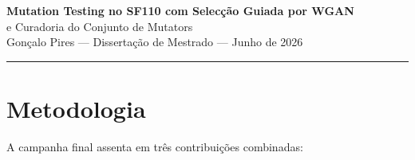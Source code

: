 \documentclass[12pt,a4paper]{article}
\begin{document}

\begin{center}
  {\LARGE\bfseries Mutation Testing no SF110 com Selecção Guiada por WGAN}\\[0.4em]
  {\large e Curadoria do Conjunto de Mutators}\\[0.8em]
  {\large Gonçalo Pires --- Dissertação de Mestrado --- Junho de 2026}
\end{center}

\bigskip
\hrule
\bigskip

\begin{abstract}
\noindent
Este relatório descreve a evolução do pipeline de \textit{mutation testing} sobre o
benchmark SF110, desde o resultado de base sem qualquer guidance até à campanha final
(\texttt{v8\_curated}) com selecção de classes-alvo treinada num modelo
WGAN-aware e exclusão dos mutators conhecidamente fracos. O \textit{weighted mutation
score} passou de \textbf{16,73\%} para \textbf{49,74\%}
(\textbf{+33,01~pp}) e a \textit{weighted test strength} passou de \textbf{63,25\%}
para \textbf{76,63\%} (\textbf{+13,38~pp}), ultrapassando o objectivo inicial de
\textbf{>70\%} de \textit{test strength}.
\end{abstract}

\section{Metodologia}

A campanha final assenta em três contribuições combinadas:
\end{document}
